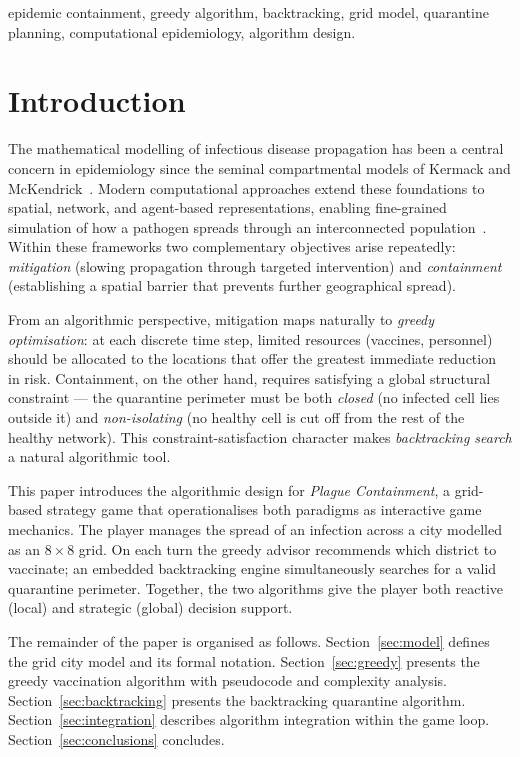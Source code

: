\documentclass[conference]{IEEEtran}
\begin{document}
\begin{IEEEkeywords}
epidemic containment, greedy algorithm, backtracking, grid model, quarantine
planning, computational epidemiology, algorithm design.
\end{IEEEkeywords}

\section{Introduction}
\label{sec:intro}

The mathematical modelling of infectious disease propagation has been a central
concern in epidemiology since the seminal compartmental models of Kermack and
McKendrick~\cite{kermack1927contribution}. Modern computational approaches extend
these foundations to spatial, network, and agent-based representations, enabling
fine-grained simulation of how a pathogen spreads through an interconnected
population~\cite{pastor2015epidemic}. Within these frameworks two complementary
objectives arise repeatedly: \emph{mitigation} (slowing propagation through targeted
intervention) and \emph{containment} (establishing a spatial barrier that prevents
further geographical spread).

From an algorithmic perspective, mitigation maps naturally to \emph{greedy
optimisation}: at each discrete time step, limited resources (vaccines, personnel)
should be allocated to the locations that offer the greatest immediate reduction
in risk. Containment, on the other hand, requires satisfying a global structural
constraint — the quarantine perimeter must be both \emph{closed} (no infected cell
lies outside it) and \emph{non-isolating} (no healthy cell is cut off from the rest
of the healthy network). This constraint-satisfaction character makes
\emph{backtracking search} a natural algorithmic tool.

This paper introduces the algorithmic design for \emph{Plague Containment}, a
grid-based strategy game that operationalises both paradigms as interactive game
mechanics. The player manages the spread of an infection across a city modelled as an
$8\times8$ grid. On each turn the greedy advisor recommends which district to
vaccinate; an embedded backtracking engine simultaneously searches for a valid
quarantine perimeter. Together, the two algorithms give the player both reactive
(local) and strategic (global) decision support.

The remainder of the paper is organised as follows. Section~\ref{sec:model} defines
the grid city model and its formal notation. Section~\ref{sec:greedy} presents the
greedy vaccination algorithm with pseudocode and complexity analysis.
Section~\ref{sec:backtracking} presents the backtracking quarantine algorithm.
Section~\ref{sec:integration} describes algorithm integration within the game loop.
Section~\ref{sec:conclusions} concludes.
\end{document}
